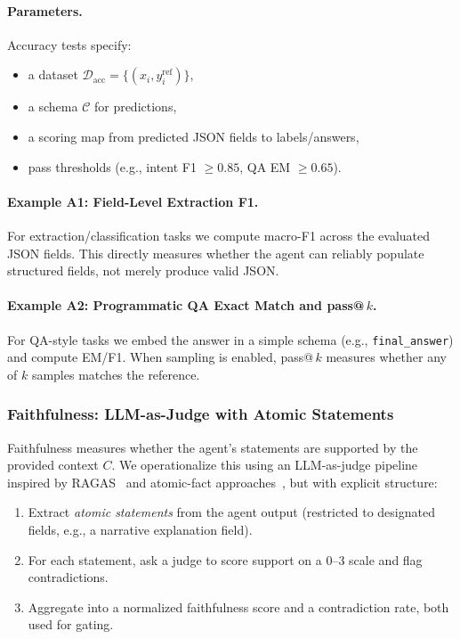 \documentclass[11pt]{article}
\begin{document}
\paragraph{Parameters.}
Accuracy tests specify:
\begin{itemize}[leftmargin=12pt]
    \item a dataset $\mathcal{D}_{\text{acc}} = \{(x_i, y_i^{\text{ref}})\}$,
    \item a schema $\mathcal{C}$ for predictions,
    \item a scoring map from predicted JSON fields to labels/answers,
    \item pass thresholds (e.g., intent F1 $\ge 0.85$, QA EM $\ge 0.65$).
\end{itemize}

\paragraph{Example A1: Field-Level Extraction F1.}
For extraction/classification tasks we compute macro-F1 across the evaluated JSON fields.
This directly measures whether the agent can reliably populate structured fields, not merely produce valid JSON.

\paragraph{Example A2: Programmatic QA Exact Match and pass@\,$k$.}
For QA-style tasks we embed the answer in a simple schema (e.g., \texttt{final\_answer}) and compute EM/F1.
When sampling is enabled, pass@\,$k$ measures whether any of $k$ samples matches the reference.

\subsubsection{Faithfulness: LLM-as-Judge with Atomic Statements}

Faithfulness measures whether the agent’s statements are supported by the provided context $C$.
We operationalize this using an LLM-as-judge pipeline inspired by RAGAS~\citep{es2023ragas} and atomic-fact approaches~\citep{atomicFacts2024}, but with explicit structure:

\begin{enumerate}[leftmargin=12pt]
    \item Extract \emph{atomic statements} from the agent output (restricted to designated fields, e.g., a narrative explanation field).
    \item For each statement, ask a judge to score support on a 0--3 scale and flag contradictions.
    \item Aggregate into a normalized faithfulness score and a contradiction rate, both used for gating.
\end{enumerate}
\end{document}
